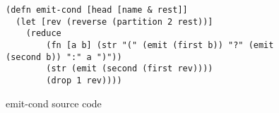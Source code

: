 
\begin{figure}[ht]
\begin{verbatim}
(defn emit-cond [head [name & rest]]
  (let [rev (reverse (partition 2 rest))]
    (reduce
    	(fn [a b] (str "(" (emit (first b)) "?" (emit (second b)) ":" a ")"))
        (str (emit (second (first rev))))
        (drop 1 rev))))
\end{verbatim}
\caption{emit-cond source code}
\label{fig:emit-cond-code}
\end{figure}
